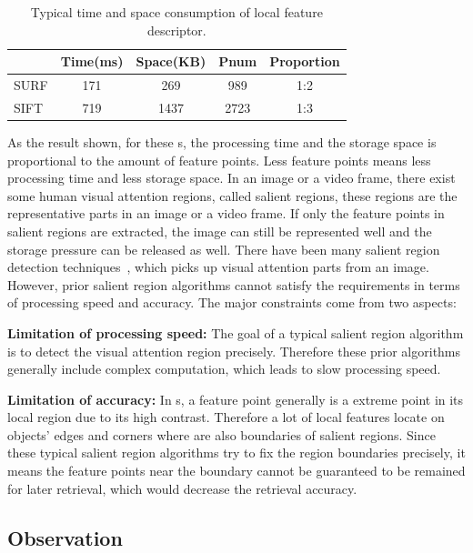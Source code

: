 \begin{table}[!ht]
\begin{center}
\begin{tabular}{|l|c|c|c|c|}
\hline
 & Time(ms) & Space(KB) & Pnum & Proportion \\
\hline
SURF & 171 & 269 & 989   &  1:2\\\hline
SIFT & 719 & 1437 & 2723 & 1:3 \\\hline
\end{tabular}
\end{center}
\caption{Typical time and space consumption of local feature descriptor.}
\label{tab:surfandsift}
\end{table}

As the result shown, for these {\lfea}s, the processing time and the storage space is proportional to the amount of feature points. Less feature points means less processing time and less storage space. In an image or a video frame, there exist some human visual attention regions, called salient regions, these regions are the representative parts in an image or a video frame. If only the feature points in salient regions are extracted, the image can still be represented well and the storage pressure can be released as well. There have been many salient region detection techniques~\cite{cheng2011global,achanta2009frequency,itti1998model}, which picks up visual attention parts from an image. However, prior salient region algorithms cannot satisfy the requirements in terms of processing speed and accuracy. The major constraints come from two aspects:
\squishlist
\item \textbf{Limitation of processing speed:} The goal of a typical salient region algorithm is to detect the visual attention region precisely. Therefore these prior algorithms generally include complex computation, which leads to slow processing speed.

\item \textbf{Limitation of accuracy:} In {\lfea}s, a feature point generally is a extreme point in its local region due to its high contrast. Therefore a lot of local features locate on objects' edges and corners where are also boundaries of salient regions. Since these typical salient region algorithms try to fix the region boundaries precisely, it means the feature points near the boundary cannot be guaranteed to be remained for later retrieval, which would decrease the retrieval accuracy.
\squishend


\subsection{Observation}
\label{subsec:observation}



